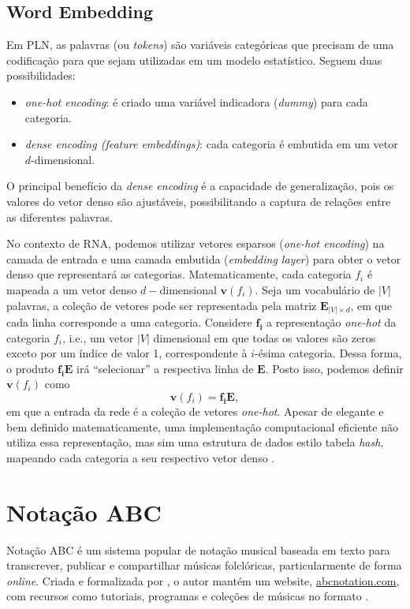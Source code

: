 \documentclass[twoside]{automatextcc}
\newcommand{\bs}[1]{\boldsymbol{#1}}
\begin{document}
\subsection{Word Embedding}
Em PLN, as palavras (ou \textit{tokens}) são variáveis categóricas que precisam de uma codificação para que sejam utilizadas em um modelo estatístico. Seguem duas possibilidades:
\begin{itemize}
    \item \textit{one-hot encoding}: é criado uma variável indicadora (\textit{dummy}) para cada categoria.
    \item \textit{dense encoding (feature embeddings)}: cada categoria é embutida em um vetor $d$-dimensional.
\end{itemize}
O principal benefício da \textit{dense encoding} é a capacidade de generalização, pois os valores do vetor denso são ajustáveis, possibilitando a captura de relações entre as diferentes palavras.

No contexto de RNA, podemos utilizar vetores esparsos (\textit{one-hot encoding}) na camada de entrada e uma camada embutida (\textit{embedding layer}) para obter o vetor denso que representará as categorias. Matematicamente, cada categoria $f_i$ é mapeada a um vetor denso $d-$dimensional $\bs v(f_i)$. Seja um vocabulário de $|V|$ palavras, a coleção de vetores pode ser representada pela matriz $\bs{E}_{|V| \times d}$, em que cada linha corresponde a uma categoria. Considere $\bs{f_i}$ a representação \textit{one-hot} da categoria $f_i$, i.e., um vetor $|V|$ dimensional em que todas os valores são zeros exceto por um índice de valor 1, correspondente à $i$-ésima categoria. Dessa forma, o produto $\bs{f_i E}$ irá ``selecionar'' a respectiva linha de $\bs{E}$. Posto isso, podemos definir $\bs v(f_i)$ como
\begin{equation*}
    \bs v(f_i) = \bs{f_i E},
\end{equation*}
em que a entrada da rede é a coleção de vetores \textit{one-hot}. Apesar de elegante e bem definido matematicamente, uma implementação computacional eficiente não utiliza essa representação, mas sim uma estrutura de dados estilo tabela \textit{hash}, mapeando cada categoria a seu respectivo vetor denso \citep{goldberg2017}.



\section{Notação ABC}
Notação ABC é um sistema popular de notação musical baseada em texto para transcrever, publicar e compartilhar músicas folclóricas, particularmente de forma \textit{online}. Criada e formalizada por \citet{walshaw1993}, o autor mantém um website, \href{https://abcnotation.com}{\url{abcnotation.com}}, com recursos como tutoriais, programas e coleções de músicas no formato \citep{walshaw2014}.
\end{document}

